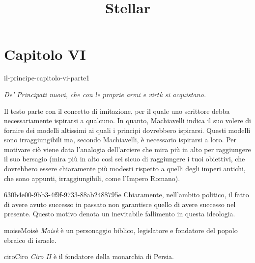 \documentclass[preview]{standalone}
\begin{document}
\title{Stellar}
\genpage

\section{Capitolo VI}

\begin{snippet}{il-principe-capitolo-vi-parte1}
    \begin{center}
        \begin{minipage}{0.75\textwidth}
            \itshape
            De' Principati nuovi, che con le proprie armi e virtù si acquistano. 
        \end{minipage}
    \end{center}
    \vspace{0.25cm}
    Il testo parte con il concetto di imitazione, per il quale uno scrittore
    debba necessariamente ispirarsi a qualcuno.
    In quanto, Machiavelli indica il suo volere di fornire dei modelli altissimi
    ai quali i principi dovrebbero ispirarsi.
    Questi modelli sono irraggiungibili ma, secondo Machiavelli, è necessario ispirarsi a loro.
    Per motivare ciò viene data l'analogia dell'arciere che mira più in alto per raggiungere il suo bersagio
    (mira più in alto così sei sicuo di raggiungere i tuoi obiettivi, che dovrebbero essere chiaramente
    più modesti rispetto a quelli degli imperi antichi, che sono appunti, irraggiungibili, come l'Impero Romano).
\end{snippet}

\begin{snippetnote}{630b4e00-9bb3-4f9f-9733-88ab2488795e}{}
    Chiaramente, nell'ambito \underline{politico}, il fatto di avere avuto successo in passato
    non garantisce quello di avere successo nel presente.
    Questo motivo denota un inevitabile fallimento in questa ideologia.
\end{snippetnote}


\begin{snippetcharacter}{moise}{Moisè}
    \textit{Moisè} è un personaggio biblico, legislatore e fondatore del popolo ebraico di israele.
\end{snippetcharacter}

\begin{snippetcharacter}{ciro}{Ciro}
    \textit{Ciro II} è il fondatore della monarchia di Persia.
\end{snippetcharacter}
\end{document}

